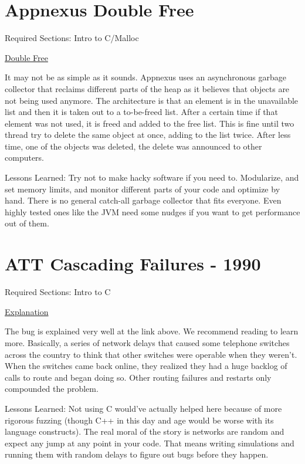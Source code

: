 \section{Appnexus Double Free}

Required Sections: Intro to C/Malloc

\href{https://techblog.appnexus.com/2013-09-17-outage-postmortem-586b19ae4307}{Double Free}

It may not be as simple as it sounds.
Appnexus uses an asynchronous garbage collector that reclaims different parts of the heap as it believes that objects are not being used anymore.
The architecture is that an element is in the unavailable list and then it is taken out to a to-be-freed list.
After a certain time if that element was not used, it is freed and added to the free list.
This is fine until two thread try to delete the same object at once, adding to the list twice. After less time, one of the objects was deleted, the delete was announced to other computers.

Lessons Learned: Try not to make hacky software if you need to. Modularize, and set memory limits, and monitor different parts of your code and optimize by hand. There is no general catch-all garbage collector that fits everyone. Even highly tested ones like the JVM need some nudges if you want to get performance out of them.

\section{ATT Cascading Failures - 1990}

Required Sections: Intro to C

\href{http://users.csc.calpoly.edu/~jdalbey/SWE/Papers/att_collapse.html}{Explanation}

The bug is explained very well at the link above.
We recommend reading to learn more.
Basically, a series of network delays that caused some telephone switches across the country to think that other switches were operable when they weren't.
When the switches came back online, they realized they had a huge backlog of calls to route and began doing so.
Other routing failures and restarts only compounded the problem.

Lessons Learned: Not using C would've actually helped here because of more rigorous fuzzing (though C++ in this day and age would be worse with its language constructs).
The real moral of the story is networks are random and expect any jump at any point in your code.
That means writing simulations and running them with random delays to figure out bugs before they happen.
